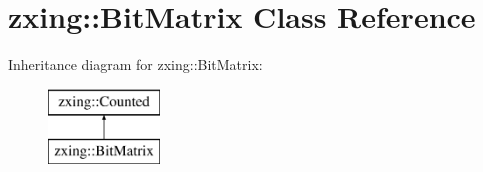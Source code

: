 \hypertarget{classzxing_1_1_bit_matrix}{}\section{zxing\+:\+:Bit\+Matrix Class Reference}
\label{classzxing_1_1_bit_matrix}
Inheritance diagram for zxing\+:\+:Bit\+Matrix\+:\begin{figure}[H]
\begin{center}
\leavevmode
\includegraphics[height=2.000000cm]{classzxing_1_1_bit_matrix}
\end{center}
\end{figure}
